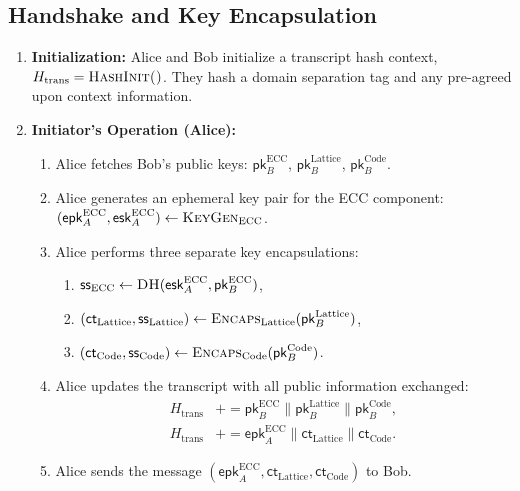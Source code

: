 \documentclass[11pt]{article}
\begin{document}
\subsection{Handshake and Key Encapsulation}
\begin{enumerate}
    \item \textbf{Initialization:} Alice and Bob initialize a transcript hash context, $H_{\text{trans}} = \textsc{HashInit()}$. They hash a domain separation tag and any pre-agreed upon context information.
    \item \textbf{Initiator's Operation (Alice):}
    \begin{enumerate}
        \item Alice fetches Bob's public keys: $\mathsf{pk}^{\mathrm{ECC}}_B$, $\mathsf{pk}^{\mathrm{Lattice}}_B$, $\mathsf{pk}^{\mathrm{Code}}_B$.
        \item Alice generates an ephemeral key pair for the ECC component: $(\mathsf{epk}^{\mathrm{ECC}}_A, \mathsf{esk}^{\mathrm{ECC}}_A) \leftarrow \textsc{KeyGen}_{\mathrm{ECC}}$.
        \item Alice performs three separate key encapsulations:
        \begin{enumerate}
            \item $\mathsf{ss}_{\mathrm{ECC}} \leftarrow \textsc{DH}(\mathsf{esk}^{\mathrm{ECC}}_A, \mathsf{pk}^{\mathrm{ECC}}_B)$,
            \item $(\mathsf{ct}_{\mathrm{Lattice}}, \mathsf{ss}_{\mathrm{Lattice}}) \leftarrow \textsc{Encaps}_{\mathrm{Lattice}}(\mathsf{pk}^{\mathrm{Lattice}}_B)$,
            \item $(\mathsf{ct}_{\mathrm{Code}}, \mathsf{ss}_{\mathrm{Code}}) \leftarrow \textsc{Encaps}_{\mathrm{Code}}(\mathsf{pk}^{\mathrm{Code}}_B)$.
        \end{enumerate}
        \item Alice updates the transcript with all public information exchanged:
        \begin{align*}
            H_{\text{trans}} &\mathrel{+}= \mathsf{pk}^{\mathrm{ECC}}_B \parallel \mathsf{pk}^{\mathrm{Lattice}}_B \parallel \mathsf{pk}^{\mathrm{Code}}_B, \\
            H_{\text{trans}} &\mathrel{+}= \mathsf{epk}^{\mathrm{ECC}}_A \parallel \mathsf{ct}_{\mathrm{Lattice}} \parallel \mathsf{ct}_{\mathrm{Code}}.
        \end{align*}
        \item Alice sends the message $(\mathsf{epk}^{\mathrm{ECC}}_A, \mathsf{ct}_{\mathrm{Lattice}}, \mathsf{ct}_{\mathrm{Code}})$ to Bob.

\end{enumerate}
\end{enumerate}
\end{document}
